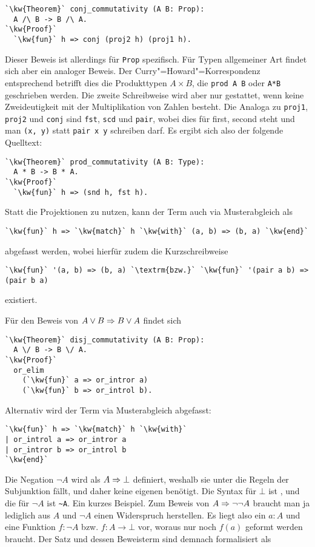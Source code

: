 \noindent
\begin{lstlisting}[escapechar=`, xleftmargin=\mathindent]
`\kw{Theorem}` conj_commutativity (A B: Prop):
  A /\ B -> B /\ A.
`\kw{Proof}`
  `\kw{fun}` h => conj (proj2 h) (proj1 h).
\end{lstlisting}
Dieser Beweis ist allerdings für \texttt{Prop} spezifisch. Für Typen
allgemeiner Art findet sich aber ein analoger Beweis. Der
Curry"=Howard"=Korrespondenz entsprechend betrifft dies die Produkttypen
$A\times B$, die \verb|prod A B| oder \verb|A*B| geschrieben werden. Die
zweite Schreibweise wird aber nur gestattet, wenn keine Zweideutigkeit
mit der Multiplikation von Zahlen besteht. Die Analoga zu
\texttt{proj1}, \texttt{proj2} und \texttt{conj} sind
\texttt{fst}, \texttt{scd} und \texttt{pair}, wobei dies für
first, second steht und man \verb|(x, y)| statt \verb|pair x y|
schreiben darf. Es ergibt sich also der folgende Quelltext:
\begin{lstlisting}[escapechar=`, xleftmargin=\mathindent]
`\kw{Theorem}` prod_commutativity (A B: Type):
  A * B -> B * A.
`\kw{Proof}`
  `\kw{fun}` h => (snd h, fst h).
\end{lstlisting}
Statt die Projektionen zu nutzen, kann der Term auch via
Musterabgleich als
\begin{lstlisting}[escapechar=`, xleftmargin=\mathindent]
`\kw{fun}` h => `\kw{match}` h `\kw{with}` (a, b) => (b, a) `\kw{end}`
\end{lstlisting}
abgefasst werden, wobei hierfür zudem die Kurzschreibweise
\begin{lstlisting}[escapechar=`, xleftmargin=\mathindent]
`\kw{fun}` '(a, b) => (b, a) `\textrm{bzw.}` `\kw{fun}` '(pair a b) => (pair b a)
\end{lstlisting}
existiert.

Für den Beweis von $A\lor B\Rightarrow B\lor A$ findet sich
\begin{lstlisting}[escapechar=`, xleftmargin=\mathindent]
`\kw{Theorem}` disj_commutativity (A B: Prop):
  A \/ B -> B \/ A.
`\kw{Proof}`
  or_elim
    (`\kw{fun}` a => or_intror a)
    (`\kw{fun}` b => or_introl b).
\end{lstlisting}
Alternativ wird der Term via Musterabgleich abgefasst:
\begin{lstlisting}[escapechar=`, xleftmargin=\mathindent]
`\kw{fun}` h => `\kw{match}` h `\kw{with}`
| or_introl a => or_intror a
| or_intror b => or_introl b
`\kw{end}`
\end{lstlisting}

\noindent
Die Negation $\lnot A$ wird als $A\Rightarrow\bot$ definiert, weshalb sie
unter die Regeln der Subjunktion fällt, und daher keine eigenen benötigt.
Die Syntax für $\bot$ ist , und die für $\lnot A$ ist
\verb|~A|. Ein kurzes Beispiel. Zum Beweis von $A\Rightarrow\lnot\lnot A$
braucht man ja lediglich aus $A$ und $\lnot A$ einen Widerspruch
herstellen. Es liegt also ein $a\colon A$ und eine Funktion
$f\colon\lnot A$ bzw. $f\colon A\to\bot$ vor, woraus nur
noch $f(a)$ geformt werden braucht. Der Satz und dessen Beweisterm sind
demnach formalisiert als

